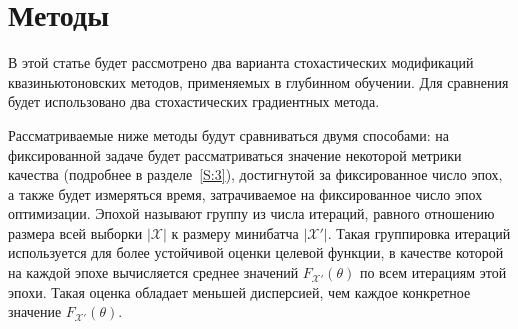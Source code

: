 \documentclass[preprint,12pt]{elsarticle}
\begin{document}
{\section{Методы}
\label{S:2}
В этой статье будет рассмотрено два варианта стохастических модификаций квазиньютоновских методов, применяемых в глубинном обучении. Для сравнения будет использовано два стохастических градиентных метода.

Рассматриваемые ниже методы будут сравниваться двумя способами: на фиксированной задаче будет рассматриваться значение некоторой метрики качества (подробнее в разделе~\ref{S:3}), достигнутой за фиксированное число эпох, а также будет измеряться время, затрачиваемое на фиксированное число эпох оптимизации. 
Эпохой называют группу из числа итераций, равного отношению размера всей выборки $|\mathcal{X}|$ к размеру минибатча $|\mathcal{X}'|$. Такая группировка итераций используется для более устойчивой оценки целевой функции, в качестве которой на каждой эпохе вычисляется среднее значений $F_{\mathcal{X}'}(\theta)$ по всем итерациям этой эпохи. Такая оценка обладает меньшей дисперсией, чем каждое конкретное значение $F_{\mathcal{X}'}(\theta)$.

}
\end{document}
